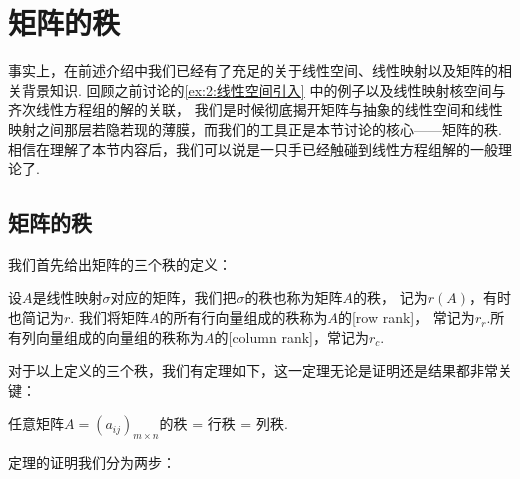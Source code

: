 \chapter{矩阵的秩}

事实上，在前述介绍中我们已经有了充足的关于线性空间、线性映射以及矩阵的相关背景知识.
回顾之前讨论的\autoref{ex:2:线性空间引入} 中的例子以及线性映射核空间与齐次线性方程组的解的关联，
我们是时候彻底揭开矩阵与抽象的线性空间和线性映射之间那层若隐若现的薄膜，而我们的工具正是本节讨论的核心——矩阵的秩.
相信在理解了本节内容后，我们可以说是一只手已经触碰到线性方程组解的一般理论了.

\section{矩阵的秩}
我们首先给出矩阵的三个秩的定义：
\begin{definition}
    设$A$是线性映射$\sigma$对应的矩阵，我们把$\sigma$的秩也称为矩阵$A$的秩，
    记为$r(A)$，有时也简记为$r$. 我们将矩阵$A$的所有行向量组成的秩称为$A$的[row rank]，
    常记为$r_r$.所有列向量组成的向量组的秩称为$A$的[column rank]，常记为$r_c$.
\end{definition}
对于以上定义的三个秩，我们有定理如下，这一定理无论是证明还是结果都非常关键：
\begin{theorem}
    任意矩阵$A=(a_{ij})_{m\times n}$的秩 = 行秩 = 列秩.
\end{theorem}
定理的证明我们分为两步：
